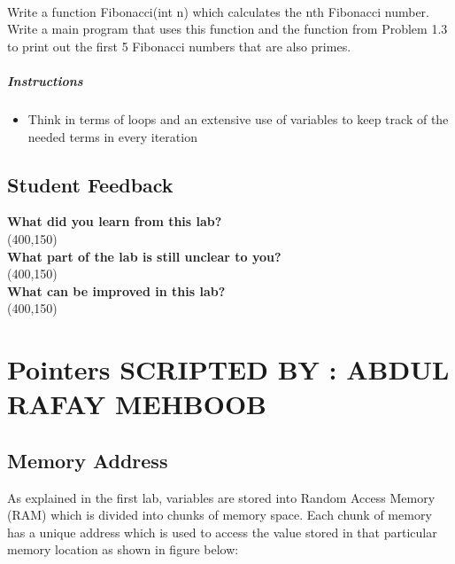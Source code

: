 \documentclass[11pt,fleqn]{book} %
\begin{document}
	~\\
	\begin{problem}
		Write a function Fibonacci(int n) which calculates the nth Fibonacci number. Write a main program that uses this function and the function from Problem 1.3 to print out the first 5 Fibonacci numbers that are also primes.
		\paragraph{Instructions}
		\begin{itemize}
			\item Think in terms of loops and an extensive use of variables to keep track of the needed terms in every iteration
		\end{itemize}
	\end{problem}
	\newpage
	\section{Student Feedback}
	\textbf{What did you learn from this lab?}\\ 
	\framebox(400,150){}\\
	\textbf{What part of the lab is still unclear to you?}\\
	\framebox(400,150){}\\
	\textbf{What can be improved in this lab?}\\ 
	\framebox(400,150){}\\
	\newpage
\chapter{Pointers \hspace{60mm} {\textsc{\small SCRIPTED BY : ABDUL RAFAY MEHBOOB}}}
\section{Memory Address}

As explained in the first lab, variables are stored into Random Access Memory (RAM) which is divided into chunks of memory space. Each chunk of memory has a unique address which is used to access the value stored in that particular memory location as shown in figure below:

\end{document}
